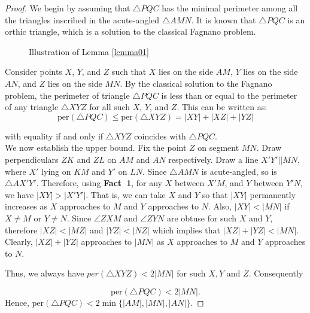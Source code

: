 \documentclass[10pt,a4paper]{amsart}
\begin{document}
\begin{proof}
	We begin by assuming that $\triangle PQC$ has the minimal perimeter among all the triangles inscribed in the acute-angled $\triangle AMN$. It is known that $\triangle PQC$ is an orthic triangle, which is a solution to the classical Fagnano problem. 
	\begin{figure}[H]
		\centering
		
		\caption{Illustration of Lemma \ref{lemma01}}
	\end{figure}
	
	Consider points   $ X   $,   $ Y   $, and   $ Z   $ such that   $ X   $ lies on the side   $ AM   $,   $ Y   $ lies on the side   $ AN   $, and   $ Z   $ lies on the side  $MN$. By the classical solution to the Fagnano problem, the perimeter of triangle   $ \triangle PQC   $ is less than or equal to the perimeter of any triangle   $ \triangle XYZ$ for all such $X$, $Y$, and $Z$. This can be written as:
	$$
	\text{per} (\triangle PQC) \leq \text{per} (\triangle XYZ) = |XY| + |XZ| + |YZ|
	$$ 
	
	with equality if and only if $\triangle XYZ$ coincides with 
	$\triangle PQC$.\\
	
	
	We now establish the upper bound. Fix the point $Z$ on segment $MN$.  Draw  perpendiculars $ZK$ and $ZL$ on $AM$ and $AN$ respectively. Draw a line $X'Y' || MN,$ where $X'$ lying on $KM$ and $Y'$ on $LN$.
	Since $\triangle AMN$ is acute-angled, so is $\triangle AX'Y'$. 
	Therefore, using \textbf{Fact~1}, for any $X$ between 
	$X'M$, and $Y$ between $Y'N$, we have $|XY| > |X'Y'|$. 
	That is, we can take $X$ and $Y$ so that $|XY|$ permanently increases as $X$ approaches to $M$ and $Y$ approaches to $N$. Also, $|XY| < |MN|$ if 
	$X \neq M$ or $Y \neq N$. Since $\angle ZXM$ and $\angle ZYN$ are obtuse for such $X$ and $ Y$, therefore 
	$|XZ| < |MZ|$ and $|YZ| < |NZ|$  	which  implies that   $|XZ|+ |YZ| < |MN|$. Clearly,  $|XZ|+|YZ|$ approaches to $|MN|$ 	as $X$ approaches to $M$ and $Y$ approaches to $N$.
	
	Thus, we always have $per(\triangle XYZ) < 2|MN|$ for such $X, Y$ and $Z$. Consequently  
	
	\begin{equation} \label{perimeter<2MN}
		\text{per} (\triangle PQC) < 2|MN|.
	\end{equation}
	Hence,
	$\mathrm{per}(\triangle PQC) < 2  \min\{|AM|, |MN|, |AN|\}.$
\end{proof}
\end{document}

